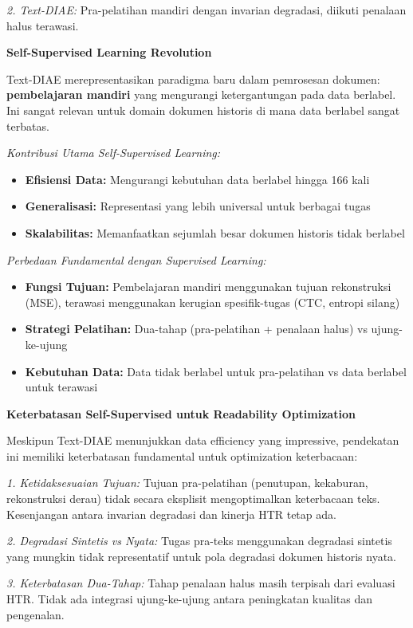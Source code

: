 \documentclass[12pt,a4paper]{article}
\begin{document}
\textit{2. Text-DIAE:} Pra-pelatihan mandiri dengan invarian degradasi, diikuti penalaan halus terawasi.

\textbf{Self-Supervised Learning Revolution}

Text-DIAE merepresentasikan paradigma baru dalam pemrosesan dokumen: \textbf{pembelajaran mandiri} yang mengurangi ketergantungan pada data berlabel. Ini sangat relevan untuk domain dokumen historis di mana data berlabel sangat terbatas.

\textit{Kontribusi Utama Self-Supervised Learning:}
\begin{itemize}
    \item \textbf{Efisiensi Data:} Mengurangi kebutuhan data berlabel hingga 166 kali
    \item \textbf{Generalisasi:} Representasi yang lebih universal untuk berbagai tugas
    \item \textbf{Skalabilitas:} Memanfaatkan sejumlah besar dokumen historis tidak berlabel
\end{itemize}

\textit{Perbedaan Fundamental dengan Supervised Learning:}
\begin{itemize}
    \item \textbf{Fungsi Tujuan:} Pembelajaran mandiri menggunakan tujuan rekonstruksi (MSE), terawasi menggunakan kerugian spesifik-tugas (CTC, entropi silang)
    \item \textbf{Strategi Pelatihan:} Dua-tahap (pra-pelatihan + penalaan halus) vs ujung-ke-ujung
    \item \textbf{Kebutuhan Data:} Data tidak berlabel untuk pra-pelatihan vs data berlabel untuk terawasi
\end{itemize}

\textbf{Keterbatasan Self-Supervised untuk Readability Optimization}

Meskipun Text-DIAE menunjukkan data efficiency yang impressive, pendekatan ini memiliki keterbatasan fundamental untuk optimization keterbacaan:

\textit{1. Ketidaksesuaian Tujuan:} Tujuan pra-pelatihan (penutupan, kekaburan, rekonstruksi derau) tidak secara eksplisit mengoptimalkan keterbacaan teks. Kesenjangan antara invarian degradasi dan kinerja HTR tetap ada.

\textit{2. Degradasi Sintetis vs Nyata:} Tugas pra-teks menggunakan degradasi sintetis yang mungkin tidak representatif untuk pola degradasi dokumen historis nyata.

\textit{3{.} Keterbatasan Dua-Tahap:} Tahap penalaan halus masih terpisah dari evaluasi HTR. Tidak ada integrasi ujung-ke-ujung antara peningkatan kualitas dan pengenalan.
\end{document}
